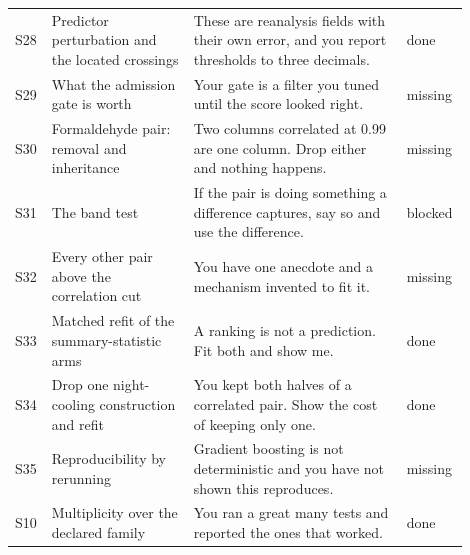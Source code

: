 \begin{longtable}{p{0.05\linewidth}p{0.30\linewidth}p{0.45\linewidth}p{0.10\linewidth}}
 S28 & Predictor perturbation and the located crossings & These are reanalysis fields with their own error, and you report thresholds to three decimals. & done \\
 S29 & What the admission gate is worth & Your gate is a filter you tuned until the score looked right. & missing \\
 S30 & Formaldehyde pair: removal and inheritance & Two columns correlated at 0.99 are one column. Drop either and nothing happens. & missing \\
 S31 & The band test & If the pair is doing something a difference captures, say so and use the difference. & blocked \\
 S32 & Every other pair above the correlation cut & You have one anecdote and a mechanism invented to fit it. & missing \\
 S33 & Matched refit of the summary-statistic arms & A ranking is not a prediction. Fit both and show me. & done \\
 S34 & Drop one night-cooling construction and refit & You kept both halves of a correlated pair. Show the cost of keeping only one. & done \\
 S35 & Reproducibility by rerunning & Gradient boosting is not deterministic and you have not shown this reproduces. & missing \\
 S10 & Multiplicity over the declared family & You ran a great many tests and reported the ones that worked. & done \\
\bottomrule
\end{longtable}

